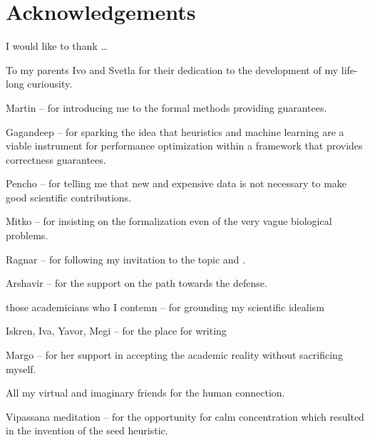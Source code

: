 
\bigskip

\begingroup
\let\clearpage\relax
\let\cleardoublepage\relax
\let\cleardoublepage\relax
\chapter*{Acknowledgements}

\def\thanks#1{%
\begingroup
\leftskip1em
\noindent #1
\par
\endgroup
}

I would like to thank \dots

To my parents Ivo and Svetla for their dedication to the development of my
life-long curiousity.

Martin -- for introducing me to the formal methods providing guarantees.

Gagandeep -- for sparking the idea that heuristics and machine learning are a
viable instrument for performance optimization within a framework that provides
correctness guarantees.

Pencho -- for telling me that new and expensive data is not necessary to make
good scientific contributions.

Mitko -- for insisting on the formalization even of the very vague biological
problems.

Ragnar -- for following my invitation to the topic and .

Arshavir -- for the support on the path towards the defense.

those academicians who I contemn -- for grounding my scientific idealism 

Iskren, Iva, Yavor, Megi -- for the place for writing

Margo -- for her support in accepting the academic reality without sacrificing myself.

All my virtual and imaginary friends for the human connection.

Vipassana meditation -- for the opportunity for calm concentration which
resulted in the invention of the seed heuristic.

\endgroup

